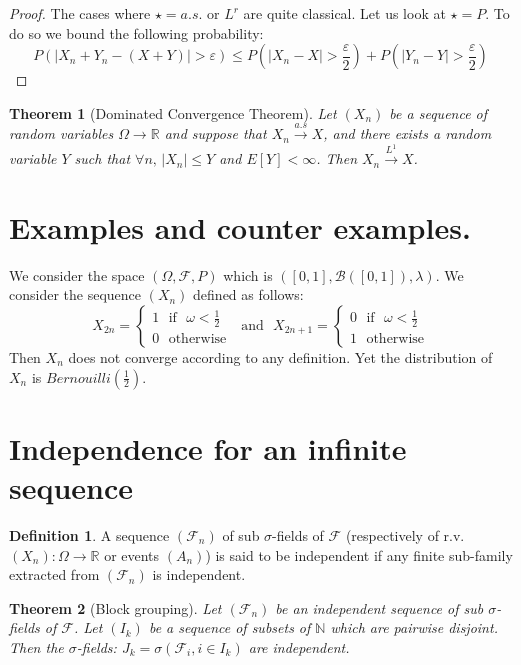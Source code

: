 \documentclass[10pt,a4paper]{book}
\newtheorem{theorem}{Theorem}[section]
\theoremstyle{definition}
\newtheorem{definition}{Definition}[section]
\begin{document}
\begin{proof}
The cases where $\star = a.s.$ or $L^r$ are quite classical. Let us look at $\star = P$. To do so we bound the following probability:
\[
P(|X_n + Y_n - (X + Y)| > \varepsilon) \leq P(|X_n - X| > \frac{\varepsilon}{2}) + P(|Y_n - Y| > \frac{\varepsilon}{2})
\]
\end{proof}

\begin{theorem}[Dominated Convergence Theorem]
Let $(X_n)$ be a sequence of random variables $\Omega \to \mathbb{R}$ and suppose that $X_n \stackrel{a.s}{\longrightarrow} X$, and there exists a random variable $Y$ such that $\forall n,\, |X_n| \leq Y$ and $E[Y] < \infty$. Then $X_n \stackrel{L^1}{\longrightarrow} X$. 
\end{theorem}

\section{Examples and counter examples.}
We consider the space $(\Omega, \mathcal{F}, P)$ which is $([0,1], \mathcal{B}([0, 1]), \lambda)$. We consider the sequence $(X_n)$ defined as follows:
\[
X_{2n} = \begin{cases} 1 \mbox{~~if~~} \omega < \frac{1}{2}\\
0 \mbox{~~otherwise}
\end{cases} \mbox{~~and~~} X_{2n+1} = \begin{cases} 0 \mbox{~~if~~} \omega < \frac{1}{2}\\
1 \mbox{~~otherwise}
\end{cases}
\]
Then $X_n$ does not converge according to any definition. Yet the distribution of $X_n$ is $Bernouilli(\frac{1}{2})$. 

\section{Independence for an infinite sequence}

\begin{definition}
A sequence $(\mathcal{F}_n)$ of sub $\sigma$-fields of $\mathcal{F}$ (respectively of r.v. $(X_n) : \Omega \to \mathbb{R}$ or events $(A_n)$) is said to be independent if any finite sub-family extracted from $(\mathcal{F}_n)$ is independent. 
\end{definition}

\begin{theorem}[Block grouping] Let $(\mathcal{F}_n)$ be an independent sequence of sub $\sigma$-fields of $\mathcal{F}$. Let $(I_k)$ be a sequence of subsets of $\mathbb{N}$ which are pairwise disjoint. Then the $\sigma$-fields: $J_k = \sigma(\mathcal{F}_i, i \in I_k)$ are independent. 

\end{theorem}
\end{document}
